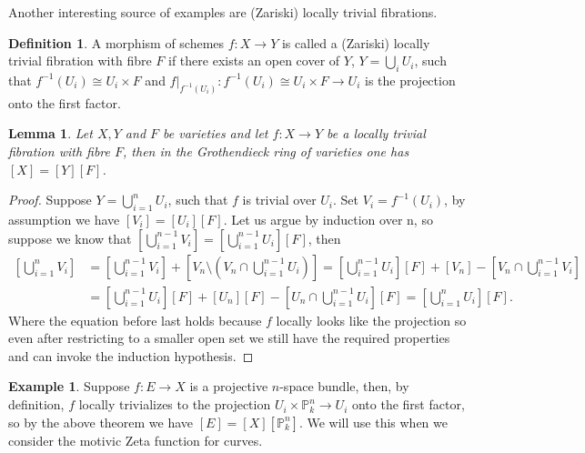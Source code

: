 \documentclass[11pt, a4paper, german, twoside]{article}
\theoremstyle{plain}
\newtheorem{lemma}[theorem]{Lemma}
\theoremstyle{definition}
\newtheorem{definition}[theorem]{Definition}
\newtheorem{example}[theorem]{Example}
\begin{document}
Another interesting source of examples are (Zariski) locally trivial fibrations.
\begin{definition}
    A morphism of schemes $f \colon X \to Y$ is called a (Zariski) locally trivial fibration with fibre $F$ if there exists an open cover of $Y$,
    $Y = \bigcup_{i} U_i$, such that $f^{-1}(U_i) \cong U_i \times F$ and $f|_{f^{-1}(U_i)} \colon f^{-1}(U_i) \cong U_i \times F \to U_i$ is
    the projection onto the first factor.
\end{definition}

\begin{lemma}
    \label{fibration}Let $X, Y$ and $F$ be varieties and
    let $f \colon X \to Y$ be a locally trivial fibration with fibre $F$, then in the Grothendieck ring of varieties
    one has $[X] = [Y][F]$.
\end{lemma}
\begin{proof}
    Suppose $Y = \bigcup_{i=1}^n U_i$, such that $f$ is trivial over $U_i$. Set $V_i = f^{-1}(U_i)$, by assumption we have $[V_i] = [U_i][F]$. 
    Let us argue by induction over n, so suppose we know that 
    $\left[ \bigcup_{i=1}^{n-1} V_i \right] = \left[\bigcup_{i=1}^{n-1} U_i \right][F]$, then
    \begin{align*}
        \left [ \bigcup_{i=1}^n V_i \right ]       
        &= \left [ \bigcup_{i=1}^{n-1} V_i \right ] + \left [ V_n \setminus (V_n \cap \bigcup_{i=1}^{n-1} U_i) \right ]
         = \left [ \bigcup_{i=1}^{n-1} U_i \right ][F] + [V_n] - \left [ V_n \cap \bigcup_{i=1}^{n-1} V_i \right ] \\
        &= \left [ \bigcup_{i=1}^{n-1} U_i \right ][F] + [U_n][F] - \left [ U_n \cap \bigcup_{i=1}^{n-1} U_i\right ][F]
         = \left [ \bigcup_{i=1}^n U_i \right ][F].
    \end{align*}
    Where the equation before last holds because $f$ locally looks like the projection so even after restricting to a smaller open set we still
    have the required properties and can invoke the induction hypothesis.
\end{proof}

\begin{example}
    \label{projBundle}
    Suppose $f \colon E \to X$ is a projective $n$-space bundle, then, by definition, $f$ locally trivializes to the projection
    $U_i \times \mathbb{P}_k^n \to U_i$ onto the first factor, so by the above theorem we have
    $[E] = [X][\mathbb{P}_k^n]$. We will use this when we consider the motivic Zeta function for curves.
\end{example}
\end{document}
